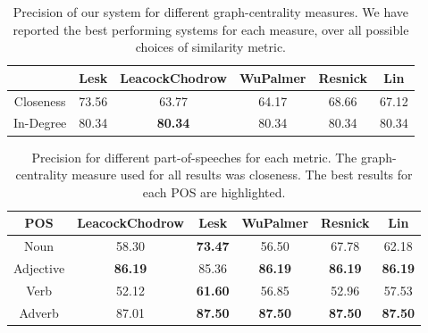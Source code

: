 \documentclass[12pt,letterpaper]{article}
\begin{document}
\label{sec:experimental-results}
\begin{table}[H]
\centering
\begin{tabular}{|c|c|c|c|c|c|}
  & Lesk & LeacockChodrow & WuPalmer & Resnick & Lin  \\
\hline
Closeness & 73.56 & 63.77 & 64.17 & 68.66 & 67.12\\
In-Degree & 80.34 & \textbf{80.34} & 80.34 & 80.34 & 80.34 \\
\end{tabular}
\caption{Precision of our system for different graph-centrality measures. We have reported the best performing systems for each measure, over all possible choices of similarity metric.}
\label{table:1}
\end{table}

\begin{table}[H]  
\centering
\begin{tabular}{|c|c|c|c|c|c|}
POS & LeacockChodrow & Lesk & WuPalmer & Resnick & Lin  \\
\hline
Noun & 58.30 & \textbf{73.47} & 56.50& 67.78 & 62.18\\
Adjective & \textbf{86.19} & 85.36 & \textbf{86.19} & \textbf{86.19} & \textbf{86.19}\\
Verb & 52.12 & \textbf{61.60} & 56.85 & 52.96 & 57.53\\
Adverb & 87.01 & \textbf{87.50} & \textbf{87.50} & \textbf{87.50} & \textbf{87.50}\\
\end{tabular}
\caption{Precision for different part-of-speeches for each metric. The graph-centrality measure used for all results was closeness. The best results for each POS are highlighted.}
\label{table:2}
\end{table}
\end{document}
